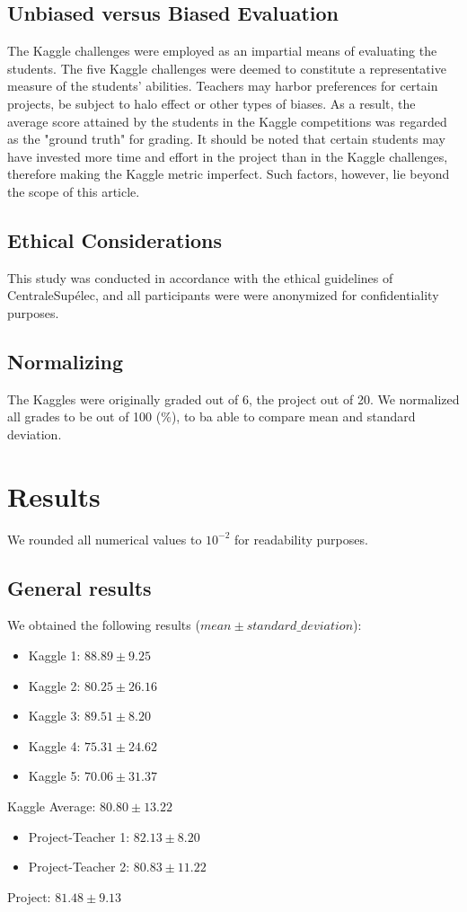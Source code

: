 \documentclass[a4paper]{article}
\begin{document}
	\subsection{Unbiased versus Biased Evaluation}
	The Kaggle challenges were employed as an impartial means of evaluating the students.
	The five Kaggle challenges were deemed to constitute a representative measure of the students' abilities.
	Teachers may harbor preferences for certain projects, be subject to halo effect or other types of biases\cite{Darby2007}\cite{Feeley2002}.
	As a result, the average score attained by the students in the Kaggle competitions was regarded as the "ground truth" for grading.
	It should be noted that certain students may have invested more time and effort in the project than in the Kaggle challenges, therefore making the Kaggle metric imperfect.
	Such factors, however, lie beyond the scope of this article.
	
	\subsection{Ethical Considerations}
	This study was conducted in accordance with the ethical guidelines of CentraleSupélec, and all participants were were anonymized for confidentiality purposes.
	
	\subsection{Normalizing}
	The Kaggles were originally graded out of 6, the project out of 20.
	We normalized all grades to be out of 100 (\%), to ba able to compare mean and standard deviation.
	
	\section{Results}
	We rounded all numerical values to $10^{-2}$ for readability purposes.
	\subsection{General results}
	We obtained the following results ($mean \pm standard\_deviation$):
	\begin{itemize}
		\item Kaggle 1: $88.89 \pm 9.25$
		\item Kaggle 2: $80.25 \pm 26.16$
		\item Kaggle 3: $89.51 \pm 8.20$
		\item Kaggle 4: $75.31 \pm 24.62$
		\item Kaggle 5: $70.06 \pm 31.37$
	\end{itemize}
	Kaggle Average: $80.80 \pm 13.22$
	\begin{itemize}
		\item Project-Teacher 1: $82.13 \pm 8.20$
		\item Project-Teacher 2: $80.83 \pm 11.22$
	\end{itemize}
	Project: $81.48 \pm 9.13$
	
\end{document}
